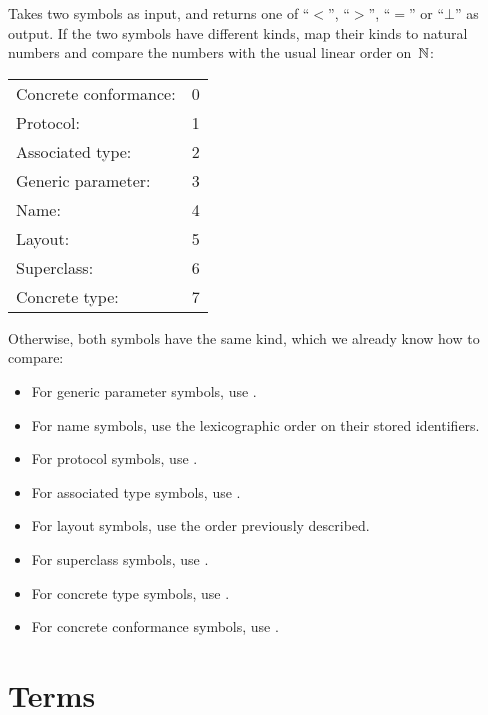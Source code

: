 \documentclass[../generics]{subfiles}
\begin{document}
\begin{algorithm}\label{symbol reduction order}
Takes two symbols as input, and returns one of ``$<$'', ``$>$'', ``$=$'' or ``$\bot$'' as output. If the two symbols have different kinds, map their kinds to natural numbers and compare the numbers with the usual linear order on~$\mathbb{N}$:
\begin{center}
\begin{tabular}{ll}
\toprule
Concrete conformance:&0\\
Protocol:&1\\
Associated type:&2\\
Generic parameter:&3\\
Name:&4\\
Layout:&5\\
Superclass:&6\\
Concrete type:&7\\
\bottomrule
\end{tabular}
\end{center}
Otherwise, both symbols have the same kind, which we already know how to compare:
\begin{itemize}
\item For generic parameter symbols, use .
\item For name symbols, use the lexicographic order on their stored identifiers.
\item For protocol symbols, use .
\item For associated type symbols, use .
\item For layout symbols, use the order previously described.
\item For superclass symbols, use .
\item For concrete type symbols, use .
\item For concrete conformance symbols, use .
\end{itemize}
\end{algorithm}

\section{Terms}\label{building terms}
\end{document}
